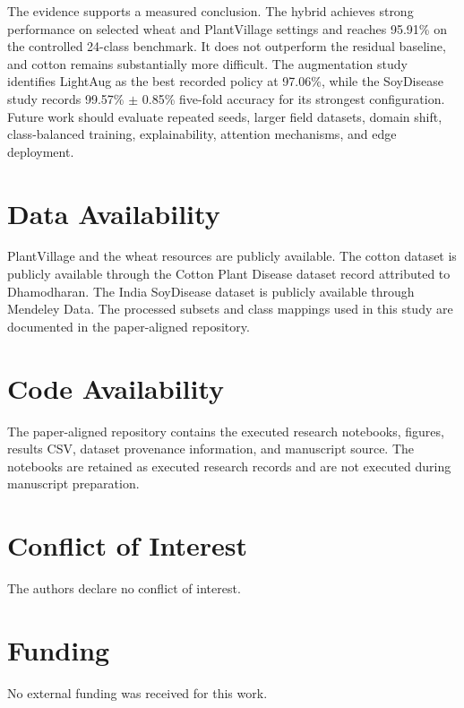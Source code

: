 \documentclass[a4paper,fleqn]{cas-dc}
\begin{document}
The evidence supports a measured conclusion. The hybrid achieves strong performance on selected wheat and PlantVillage settings and reaches 95.91\% on the controlled 24-class benchmark. It does not outperform the residual baseline, and cotton remains substantially more difficult. The augmentation study identifies LightAug as the best recorded policy at 97.06\%, while the SoyDisease study records 99.57\% $\pm$ 0.85\% five-fold accuracy for its strongest configuration. Future work should evaluate repeated seeds, larger field datasets, domain shift, class-balanced training, explainability, attention mechanisms, and edge deployment.

\section*{Data Availability}
PlantVillage and the wheat resources are publicly available. The cotton dataset is publicly available through the Cotton Plant Disease dataset record attributed to Dhamodharan. The India SoyDisease dataset is publicly available through Mendeley Data. The processed subsets and class mappings used in this study are documented in the paper-aligned repository.

\section*{Code Availability}
The paper-aligned repository contains the executed research notebooks, figures, results CSV, dataset provenance information, and manuscript source. The notebooks are retained as executed research records and are not executed during manuscript preparation.

\section*{Conflict of Interest}
The authors declare no conflict of interest.

\section*{Funding}
No external funding was received for this work.
\end{document}
